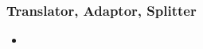 

\begin{frame}
\frametitle{Translator, Adaptor, Splitter}

\begin{itemize}
	\item 
	

	
	
\end{itemize}

\end{frame}